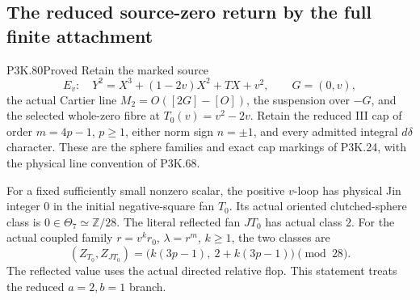 \subsection{The reduced source-zero return by the full finite attachment}
\begin{statement}{P3K.80}{Proved}
Retain the marked source
\[
 E_v:\quad Y^2=X^3+(1-2v)X^2+TX+v^2,\qquad G=(0,v),
\]
the actual Cartier line \(M_2=O([2G]-[O])\), the suspension
over \(-G\), and the selected whole-zero fibre at
\(T_0(v)=v^2-2v\). Retain the reduced III cap of order
\(m=4p-1\), \(p\ge1\), either norm sign \(n=\pm1\),
and every admitted integral \(d\delta\) character. These
are the sphere families and exact cap markings of P3K.24,
with the physical line convention of P3K.68.

For a fixed sufficiently small nonzero scalar, the positive
\(v\)-loop has physical Jin integer \(0\) in the initial
negative-square fan \(T_0\). Its actual oriented clutched-sphere
class is \(0\in\Theta_7\simeq\mathbb Z/28\). The literal
reflected fan \(JT_0\) has actual class \(2\). For the
actual coupled family \(r=v^k r_0\), \(\lambda=r^m\),
\(k\ge1\), the two classes are
\[
 (Z_{T_0},Z_{JT_0})
   =\bigl(k(3p-1),\ 2+k(3p-1)\bigr)\pmod {28}.
 \tag{P3K.80.RA.1}
\]
The reflected value uses the actual directed relative flop.
This statement treats the reduced \(a=2,b=1\) branch.
\end{statement}
